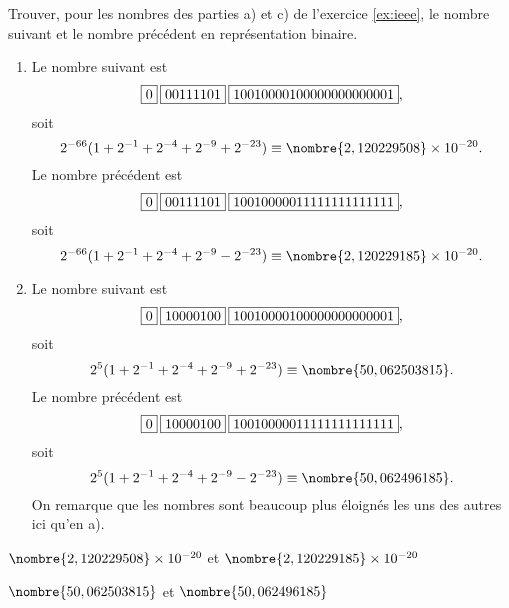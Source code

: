 \begin{exercice}
  Trouver, pour les nombres des parties a) et c) de l'exercice
  \ref{ex:ieee}, le nombre suivant et le nombre précédent en
  représentation binaire.
  \begin{sol}
    \begin{enumerate}
    \item Le nombre suivant est
      \begin{displaymath}
        \fbox{$0$}\hspace{2pt}\fbox{$00111101$}\hspace{2pt}\fbox{$10010000100000000000001$},
      \end{displaymath}
      soit
      \begin{displaymath}
        2^{-66} (1 + 2^{-1} + 2^{-4} + 2^{-9} + 2^{-23}) \\
        \equiv \nombre{2,120229508} \times 10^{-20}.
      \end{displaymath}
      Le nombre précédent est
      \begin{displaymath}
        \fbox{$0$}\hspace{2pt}\fbox{$00111101$}\hspace{2pt}\fbox{$10010000011111111111111$},
      \end{displaymath}
      soit
      \begin{displaymath}
        2^{-66} (1 + 2^{-1} + 2^{-4} + 2^{-9} - 2^{-23}) \\
        \equiv \nombre{2,120229185} \times 10^{-20}.
      \end{displaymath}
    \item Le nombre suivant est
      \begin{displaymath}
        \fbox{$0$}\hspace{2pt}\fbox{$10000100$}\hspace{2pt}\fbox{$10010000100000000000001$},
      \end{displaymath}
      soit
      \begin{displaymath}
        2^5 (1 + 2^{-1} + 2^{-4} + 2^{-9} + 2^{-23}) \\
        \equiv \nombre{50,062503815}.
      \end{displaymath}
      Le nombre précédent est
      \begin{displaymath}
        \fbox{$0$}\hspace{2pt}\fbox{$10000100$}\hspace{2pt}\fbox{$10010000011111111111111$},
      \end{displaymath}
      soit
      \begin{displaymath}
        2^5 (1 + 2^{-1} + 2^{-4} + 2^{-9} - 2^{-23}) \\
        \equiv \nombre{50,062496185}.
      \end{displaymath}
      On remarque que les nombres sont beaucoup plus éloignés les uns
      des autres ici qu'en a).
    \end{enumerate}
  \end{sol}
  \begin{rep}
    \begin{inparaenum}
    \item $\nombre{2,120229508} \times 10^{-20}$ et
      $\nombre{2,120229185} \times 10^{-20}$
    \item $\nombre{50,062503815}$ et $\nombre{50,062496185}$
    \end{inparaenum}
  \end{rep}
\end{exercice}


